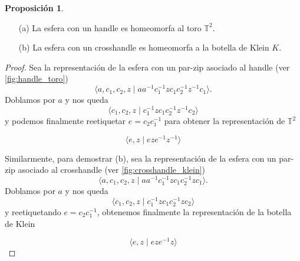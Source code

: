 \documentclass[10pt]{report}
\newcommand{\Toro}{\mathbb{T}^2}
\theoremstyle{definition}
\newtheorem{prop}[defin]{Proposición}
\begin{document}
\begin{prop}\label{prop:handletoro_crosshandleklein}
\begin{itemize}

\item[(a)] La esfera con un handle es homeomorfa al toro $\Toro$.
\item [(b)] La esfera con un crosshandle es homeomorfa a la botella de Klein $K$.

\end{itemize}
\end{prop}
\begin{proof}
Sea la representación de la esfera con un par-zip asociado al handle (ver \autoref{fig:handle_toro}) $$\langle a,c_1,c_2,z\mid aa^{-1} c_1^{-1}zc_1c_2^{-1}z^{-1}c_1\rangle.$$ Doblamos por $a$ y nos queda
\[
\langle c_1,c_2,z\mid c_1^{-1}zc_1c_2^{-1}z^{-1}c_2\rangle
\]
y podemos finalmente reetiquetar $e=c_2c_1^{-1}$ para obtener la representación de $\Toro$ 

\[
\langle e,z\mid eze^{-1}z^{-1}\rangle
\]

Similarmente, para demostrar (b), sea la representación de la esfera con un par-zip asociado al crosshandle (ver \autoref{fig:crosshandle_klein}) $$\langle a,c_1,c_2,z\mid aa^{-1} c_1^{-1}zc_1c_2^{-1}zc_1\rangle.$$ Doblamos por $a$ y nos queda
\[
\langle c_1,c_2,z\mid c_1^{-1}zc_1c_2^{-1}zc_2\rangle
\]
y reetiquetando $e=c_2c_1^{-1}$, obtenemos finalmente la representación de la botella de Klein

\[
\langle e,z\mid eze^{-1}z\rangle
\]


\end{proof}
\end{document}
